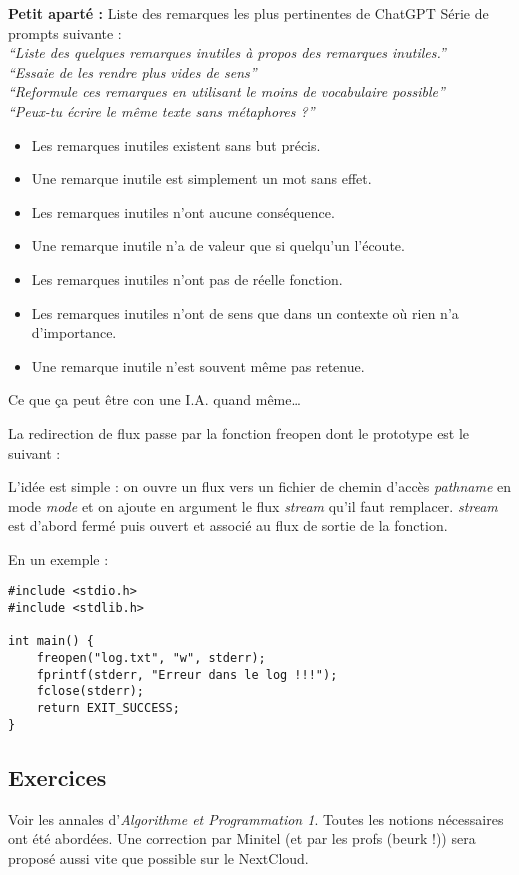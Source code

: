 \documentclass[../../../main.tex]{subfiles}
\begin{document}
\begin{minitelbasicbox}{\textbf{Petit aparté :} Liste des remarques les plus pertinentes de ChatGPT}
Série de prompts suivante : \\
\textit{``Liste des quelques remarques inutiles à propos des remarques inutiles.''}\\
\textit{``Essaie de les rendre plus vides de sens''} \\
\textit{``Reformule ces remarques en utilisant le moins de vocabulaire possible''}\\
\textit{``Peux-tu écrire le même texte sans métaphores ?''}
\begin{itemize}
	\item Les remarques inutiles existent sans but précis.
	\item Une remarque inutile est simplement un mot sans effet.
	\item Les remarques inutiles n'ont aucune conséquence.
	\item Une remarque inutile n'a de valeur que si quelqu'un l'écoute.
	\item Les remarques inutiles n'ont pas de réelle fonction.
	\item Les remarques inutiles n'ont de sens que dans un contexte où rien n'a d'importance.
	\item Une remarque inutile n'est souvent même pas retenue.
\end{itemize}
Ce que ça peut être con une I.A. quand même\dots
\end{minitelbasicbox}
La redirection de flux passe par la fonction \textsf{freopen} dont le prototype est le suivant :
\begin{center}
\end{center}
L'idée est simple : on ouvre un flux vers un fichier de chemin d'accès \textit{pathname} en mode \textit{mode} et on ajoute en argument le flux \textit{stream} qu'il faut remplacer. \textit{stream} est d'abord fermé puis ouvert et associé au flux de sortie de la fonction.
 
En un exemple :
\begin{verbatim}
#include <stdio.h>
#include <stdlib.h>

int main() {
	freopen("log.txt", "w", stderr);
	fprintf(stderr, "Erreur dans le log !!!");
	fclose(stderr);
	return EXIT_SUCCESS;
}
\end{verbatim}
\subsection{Exercices}
Voir les annales d'\textit{Algorithme et Programmation 1}. Toutes les notions nécessaires ont été abordées. Une correction par Minitel (et par les profs (beurk !)) sera proposé aussi vite que possible sur le NextCloud.
\end{document}
